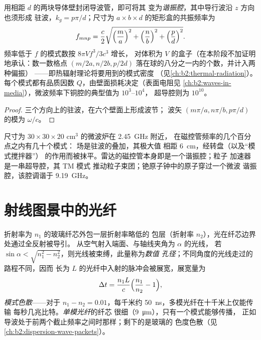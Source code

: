 \begin{proposition}[谐振腔]\label{prop:b2:guided-waves:cavity}
用相距 $d$ 的两块导体壁封闭导波管，即可将其
变为\emph{谐振腔}，其中导行波沿 $z$ 方向也须形成
驻波，$k_g = p\pi/d$；尺寸为
$a \times b \times d$ 的矩形盒的共振频率为
\[
f_{mnp} = \frac c2\sqrt{\Bigl(\frac ma\Bigr)^2 + \Bigl(\frac nb\Bigr)^2 + \Bigl(\frac pd\Bigr)^2} .
\]
频率低于 $f$ 的模式数按 $8\pi V f^3/3c^3$ 增长，
对体积为 $V$ 的盒子（在本阶段不加证明地承认：数一数格点
$(m/2a, n/2b, p/2d)$ 落在球的八分之一内的个数，并计入两种偏振）
——即热辐射理论将要用到的模式密度
（见\cref{ch:b2:thermal-radiation}）。每个模式都有品质因数
$Q$，由壁面损耗决定（表面电阻见
\cref{ch:b2:waves-in-media}），微波频率下铜腔的典型值为 $10^3$--$10^4$，
超导腔则为 $10^{10}$。
\end{proposition}

\begin{proof}
三个方向上的驻波，在六个壁面上形成波节；
波矢 $(m\pi/a, n\pi/b, p\pi/d)$ 的模为 $\omega/c$。
\end{proof}

\begin{example}[烤箱、雷达、时钟]\label{ex:b2:guided-waves:cavities}
尺寸为 $30 \times 30 \times 20$ cm$^3$ 的微波炉在 \qty{2.45}{GHz} 附近，
在磁控管频率的几个百分点之内有几十个模式：
场是驻波的叠加，其极大值
相距 \qty{6}{cm}，经转盘（以及“模式搅拌器”）
的作用而被抹平。雷达的磁控管本身即是一个谐振腔；粒子
加速器是一串超导腔，其 TM 模式
推动粒子束团；铯原子钟中的原子穿过一个微波
谐振腔，该腔调谐于 \qty{9.19}{GHz}。
\end{example}

\section{射线图景中的光纤}

\begin{proposition}[阶跃折射率光纤]\label{prop:b2:guided-waves:fibre}
折射率为 $n_1$ 的玻璃纤芯外包一层折射率略低的
包层（折射率 $n_2$），光在纤芯边界处通过全反射被导引。
从空气射入端面、与轴线夹角为 $\alpha$ 的光线，
若 $\sin\alpha < \sqrt{n_1^2 - n_2^2}$，则光线被束缚，此量称为\emph{数值
孔径}；不同角度的光线走过的路程不同，因而
长为 $L$ 的光纤中入射的脉冲会被展宽，展宽量为
\[
\Delta t = \frac{n_1L}c\Bigl(\frac{n_1}{n_2} - 1\Bigr) ,
\]
\emph{模式色散}——对于 $n_1
- n_2 = 0.01$，每千米约 \qty{50}{ns}，多模光纤在十千米上仅能传输
每秒几兆比特。\emph{单模光纤}的纤芯
很细（\qty{9}{\micro m}），只有一个模式能够传播，
正如导波处于前两个截止频率之间时那样；剩下的是玻璃的
色度色散（见\cref{ch:b2:dispersion-wave-packets}）。
\end{proposition}

